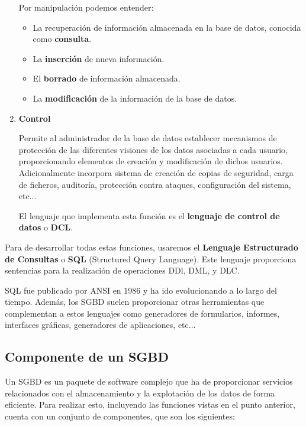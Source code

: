 \begin{enumerate}
    Por manipulación podemos entender:

    \begin{itemize}
        \item La recuperación de información almacenada en la base de datos, conocida como \textbf{consulta}.
        \item La \textbf{inserción} de nueva información.
        \item El \textbf{borrado} de información almacenada.
        \item La \textbf{modificación} de la información de la base de datos.
    \end{itemize}


    \item \textbf{Control}

    Permite al administrador de la base de datos establecer mecanismos de protección de las diferentes visiones de los datos asociadas a cada usuario, proporcionando elementos de creación y modificación de dichos usuarios. Adicionalmente incorpora sistema de creación de copias de seguridad, carga de ficheros, auditoría, protección contra ataques, configuración del sistema, etc...

    El lenguaje que implementa esta función es el \textbf{lenguaje de control de datos} o \textbf{DCL}.
\end{enumerate}

Para de desarrollar todas estas funciones, usaremos el \textbf{Lenguaje Estructurado de Consultas} o \textbf{SQL} (Structured Query Language). Este lenguaje proporciona sentencias para la realización de operaciones DDl, DML, y DLC.

SQL fue publicado por ANSI en 1986 y ha ido evolucionando a lo largo del tiempo. Además, los SGBD suelen proporcionar otras herramientas que complementan a estos lenguajes como generadores de formularios, informes, interfaces gráficas, generadores de aplicaciones, etc...

\subsection{Componente de un SGBD}
Un SGBD es un paquete de software complejo que ha de proporcionar servicios relacionados con el almacenamiento y la explotación de los datos de forma eficiente. Para realizar esto, incluyendo las funciones vistas en el punto anterior, cuenta con un conjunto de componentes, que son los siguientes:

